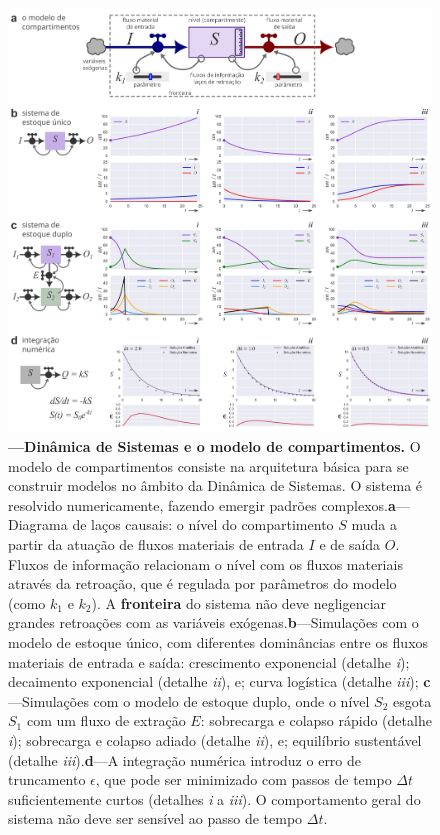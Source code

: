 \documentclass[./main.tex]{subfiles}
\begin{document}
\begin{figure}[t!] %
	\centering				
	\includegraphics[width=0.95\linewidth]{figs/fig_dynamics.jpg}		
	\caption[Dinâmica de Sistemas e o modelo de compartimentos]
	{\textbf{---\;Dinâmica de Sistemas e o modelo de compartimentos.}\; O modelo de compartimentos consiste na arquitetura básica para se construir modelos no âmbito da Dinâmica de Sistemas. O sistema é resolvido numericamente, fazendo emergir padrões complexos.\;\textbf{a}\;---\;Diagrama de laços causais: o nível do compartimento $S$ muda a partir da atuação de fluxos materiais de entrada $I$ e de saída $O$. Fluxos de informação relacionam o nível com os fluxos materiais através da retroação, que é regulada por parâmetros do modelo (como $k_1$ e $k_2$). A \textbf{fronteira} do sistema não deve negligenciar grandes retroações com as variáveis exógenas.\;\textbf{b}\;---\;Simulações com o modelo de estoque único, com diferentes dominâncias entre os fluxos materiais de entrada e saída: crescimento exponencial (detalhe \textrm{\textit{i}}); decaimento exponencial (detalhe \textrm{\textit{ii}}), e; curva logística (detalhe \textrm{\textit{iii}}); \;\textbf{c}\;---\;Simulações com o modelo de estoque duplo, onde o nível $S_2$ esgota $S_1$ com um fluxo de extração $E$: sobrecarga e colapso rápido (detalhe \textrm{\textit{i}}); sobrecarga e colapso adiado (detalhe \textrm{\textit{ii}}), e; equilíbrio sustentável (detalhe \textrm{\textit{iii}}).\;\textbf{d}\;---\;A integração numérica introduz o erro de truncamento $\epsilon$, que pode ser minimizado com passos de tempo $\Delta t$ suficientemente curtos (detalhes \textrm{\textit{i}} a \textrm{\textit{iii}}). O comportamento geral do sistema não deve ser sensível ao passo de tempo $\Delta t$.
	}
\label{fig:sys:dynamics}  %
\end{figure}
\end{document}
